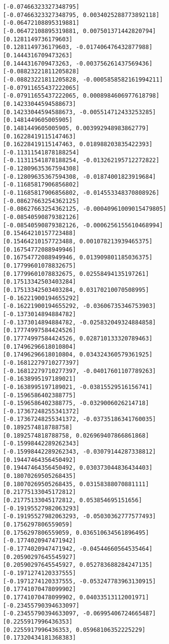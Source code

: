 \documentclass[11pt]{article}
\begin{document}
\begin{Verbatim}[commandchars=\\\{\}]
[-0.07466323327348795]
[-0.07466323327348795, 0.0034025288773892118]
[-0.06472108895319881]
[-0.06472108895319881, 0.007501371442820794]
[0.1281149736179603]
[0.1281149736179603, -0.017406476432877988]
[0.1444316709473263]
[0.1444316709473263, -0.003756261437569436]
[-0.08823221811205828]
[-0.08823221811205828, -0.0005858582161994211]
[-0.07911655437222065]
[-0.07911655437222065, 0.0008984606977618798]
[0.14233044594588673]
[0.14233044594588673, -0.005514712433253285]
[0.1481449605005905]
[0.1481449605005905, 0.003992948983862779]
[0.16228419115147463]
[0.16228419115147463, 0.018988203835422393]
[-0.11311541878188254]
[-0.11311541878188254, -0.013262195712272822]
[-0.12809635367594308]
[-0.12809635367594308, -0.01874001823919684]
[-0.11685817906856802]
[-0.11685817906856802, -0.014553348370808926]
[-0.08627663254362125]
[-0.08627663254362125, -0.00040961009015479805]
[-0.08540590879382126]
[-0.08540590879382126, -0.0006256155610468994]
[0.15464210157723488]
[0.15464210157723488, 0.001078213939465375]
[0.16754772088949946]
[0.16754772088949946, 0.013909801185036375]
[0.17799601078832675]
[0.17799601078832675, 0.02558494135197261]
[0.17513342503403284]
[0.17513342503403284, 0.03170210070508995]
[-0.16221900194655292]
[-0.16221900194655292, -0.03606735346753903]
[-0.1373014894884782]
[-0.1373014894884782, -0.025832049324884858]
[0.17774997584424526]
[0.17774997584424526, 0.028710133320789463]
[0.17496296618010804]
[0.17496296618010804, 0.034324360579361925]
[-0.16812279710277397]
[-0.16812279710277397, -0.04017601107789263]
[-0.1638995197189021]
[-0.1638995197189021, -0.03815529516156741]
[-0.1596586402388775]
[-0.1596586402388775, -0.0329006026214718]
[-0.17367248255341372]
[-0.17367248255341372, -0.03735186341760035]
[0.1892574818788758]
[0.1892574818788758, 0.026969407866861868]
[-0.15998442289262343]
[-0.15998442289262343, -0.03079144287338812]
[0.19447464356450492]
[0.19447464356450492, 0.030373044836434403]
[0.18070269505268435]
[0.18070269505268435, 0.03158388070881111]
[0.21775133045172812]
[0.21775133045172812, 0.053854695151656]
[-0.19195527982063293]
[-0.19195527982063293, -0.05030362777577493]
[0.1756297806559059]
[0.1756297806559059, 0.036510634561896495]
[-0.1774020947471942]
[-0.1774020947471942, -0.04544660564535464]
[0.20590297645545927]
[0.20590297645545927, 0.052783688284247135]
[-0.1971274120337555]
[-0.1971274120337555, -0.053247783963130915]
[0.17741070478099902]
[0.17741070478099902, 0.04033513112001971]
[-0.23455790394633097]
[-0.23455790394633097, -0.06995406724665487]
[0.2255917996436353]
[0.2255917996436353, 0.05968106352225229]
[0.17320434181368383]

\end{Verbatim}
\end{document}

